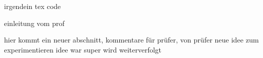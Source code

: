 irgendein tex code

einleitung vom prof

hier kommt ein neuer abschnitt, kommentare für prüfer, von prüfer
neue idee zum experimentieren
idee war super wird weiterverfolgt
